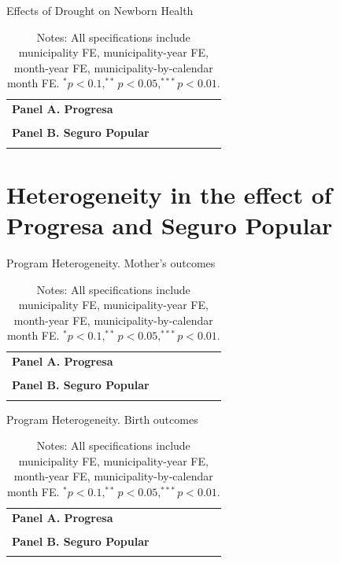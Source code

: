 \documentclass[12pt, oneside]{article}      %
\begin{document}
\begin{table}[!ht]
\centering
\caption{Effects of Drought on Newborn Health}\label{tab:hospital_drought}
\fontsize{10pt}{12pt}\selectfont
\begin{tabular}{lcccccc}
\toprule
\textbf{Panel A. Progresa} & & & &  \\
 \\
\midrule
\textbf{Panel B. Seguro Popular} & & & & \\
 \\
\bottomrule
\end{tabular}
\caption*{\footnotesize{Notes: All specifications include municipality FE, municipality-year FE, month-year FE, municipality-by-calendar month FE. $^* p<0.1, ^{**} p<0.05, ^{***} p<0.01$.}}
\end{table}

\clearpage
\newpage


\section{Heterogeneity in the effect of Progresa and Seguro Popular}

\begin{table}[!ht]
\centering
\caption{Program Heterogeneity. Mother's outcomes}\label{tab:program_heterogeneity_mothers}
\fontsize{10pt}{12pt}\selectfont
\begin{tabular}{lcccccc}
\toprule
\textbf{Panel A. Progresa} & & & &  \\
 \\
\midrule
\textbf{Panel B. Seguro Popular} & & & & \\
 \\
\bottomrule
\end{tabular}
\caption*{\footnotesize{Notes: All specifications include municipality FE, municipality-year FE, month-year FE, municipality-by-calendar month FE. $^* p<0.1, ^{**} p<0.05, ^{***} p<0.01$.}}
\end{table}

\clearpage
\newpage


\begin{table}[!ht]
\centering
\caption{Program Heterogeneity. Birth outcomes}\label{tab:program_heterogeneity_birth}
\fontsize{10pt}{12pt}\selectfont
\begin{tabular}{lcccccc}
\toprule
\textbf{Panel A. Progresa} & & & &  \\
 \\
\midrule
\textbf{Panel B. Seguro Popular} & & & & \\
 \\
\bottomrule
\end{tabular}
\caption*{\footnotesize{Notes: All specifications include municipality FE, municipality-year FE, month-year FE, municipality-by-calendar month FE. $^* p<0.1, ^{**} p<0.05, ^{***} p<0.01$.}}
\end{table}
\end{document}
